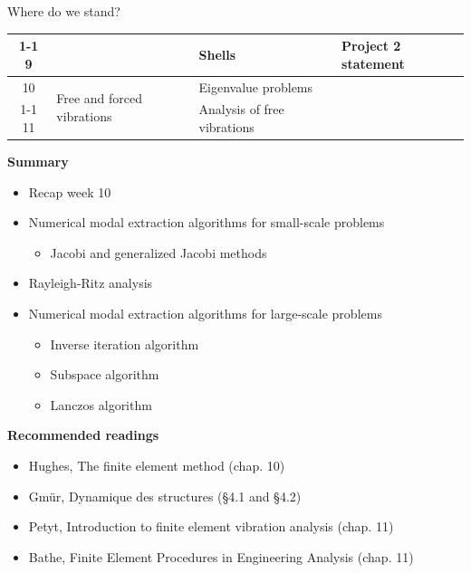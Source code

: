 \documentclass[aspectratio=169]{beamer}
\begin{document}
{\begin{frame}{Where do we stand?}
\begin{center}
\begin{tabular}{|c|l|l|l|}
        \cline{1-1} \cline{3-4}
        9                                  &                                                & Shells                             & Project 2 statement    \\
        \hline
        10                                 & \multirow{2}{7em}{Free and forced vibrations}  & Eigenvalue problems                &                        \\
        \cline{1-1} \cline{3-4} 11         &                                                & Analysis of free vibrations        &                        \\
        \hline
      \end{tabular}
    \end{center}
    \vspace{1cm}
  \end{frame}

  \begin{frame}
    \textbf{\large Summary}
    \begin{itemize}
      \item Recap week 10
      \item Numerical modal extraction algorithms for small-scale problems
            \begin{itemize}
              \item Jacobi and generalized Jacobi methods
            \end{itemize}
      \item  Rayleigh-Ritz analysis
      \item Numerical modal extraction algorithms for large-scale problems
            \begin{itemize}
              \item Inverse iteration algorithm
              \item Subspace algorithm
              \item Lanczos algorithm
            \end{itemize}
    \end{itemize}
    \vspace{.5cm}

    \textbf{\large Recommended readings}
    \begin{itemize}
      \item[(H)] Hughes, The finite element method (chap. 10)
      \item[(G)] Gmür, Dynamique des structures (§4.1 and §4.2)
      \item[(P)] Petyt, Introduction to finite element vibration analysis (chap. 11)
      \item[(B)] Bathe, Finite Element Procedures in Engineering Analysis (chap. 11)
    \end{itemize}
  \end{frame}
}
\end{document}
